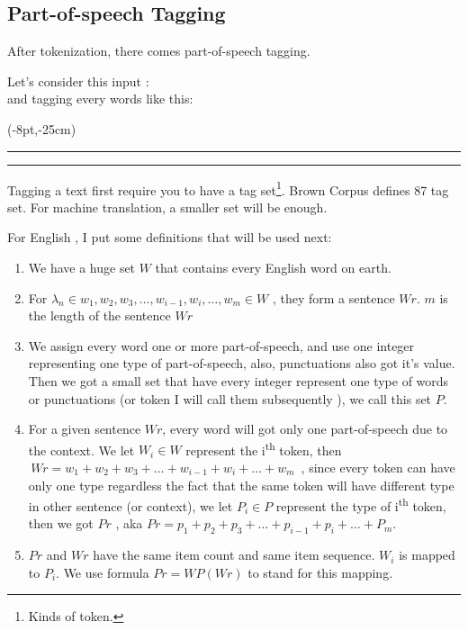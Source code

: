 \subsection{Part-of-speech Tagging}

After tokenization, there comes part-of-speech tagging.

Let's consider this input :
\\\indent
and tagging every words like this:

\thisfancyput(-8pt,-25cm){
\rule{.5pt}{25cm}
\hspace*{\textwidth}
\rule{.5pt}{25cm}
}


Tagging a text first require you to have a tag set\footnote{Kinds of token.}.
 Brown Corpus
 defines 87 tag set. For machine translation, a smaller set will be enough. 
 
For English ,  I put some definitions that will be used next:
\begin{enumerate}

\item We have a huge set $W$ that contains every English word on earth.

\item For $ \lambda_n \in w_1 , w_2 , w_3, \ldots , w_{i-1} , w_i  , \ldots , w_m \in W $ , they
		form a sentence $Wr$. $m$ is the length of the sentence $Wr$ 
\item We assign every word one or more part-of-speech, and use one integer representing  one type of part-of-speech, also, punctuations also got it's value. Then we got  a  small set that have every integer represent one type of words or punctuations (or token I will call them subsequently ), we call this set $ P $.
\item For a given sentence $Wr$, every word will got only one part-of-speech due to the context.
We let $W_i \in W $ represent the i\textsuperscript{th} token, then $ \, Wr = w_1 + w_2 + w_3 + \ldots + w_{i-1} + w_i  + \ldots + w_m  \, $ , since every token can have only one type regardless the fact that the same token will have different type in other sentence (or context), we let $P_i \in P $ represent the type of i\textsuperscript{th} token, then we got $Pr$ , aka $ Pr = p_1 + p_2 + p_3 + \ldots + p_{i-1} + p_i + \ldots + P_m $. 

\item $Pr $ and $ Wr $ have the same item count and same item sequence. $ W_i$ is mapped to $ P_i $. We use formula $ Pr = WP(Wr)$ to stand for this mapping. %
\end{enumerate}

